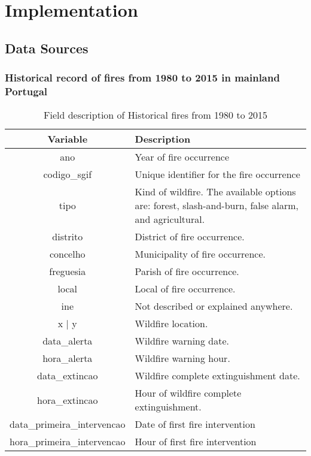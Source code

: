 \chapter{Implementation}
\label{sec:implementation}

\section{Data Sources}

\subsection{Historical record of fires from 1980 to 2015 in mainland Portugal \cite{centraldedados_incendios_website}\cite{centraldedados_incendios} \cite{icnf2024}}

\begin{table}[h!]
\caption{Field description of Historical fires from 1980 to 2015}
\label{forest_inventory}
\centering
\small
\begin{tabular}{|c|p{7.5cm}|} %
\hline
\textbf{Variable} & \textbf{Description}\\
\hline
ano  & Year of fire occurrence \\
\hline
codigo\_sgif & Unique identifier for the fire occurrence \\
\hline
tipo  & Kind of wildfire. The available options are: forest, slash-and-burn, false alarm, and agricultural.\\
\hline
distrito  & District of fire occurrence. \\
\hline
concelho  & Municipality of fire occurrence. \\
\hline
freguesia  & Parish of fire occurrence.\\
\hline
local  & Local of fire occurrence. \\
\hline
ine  & Not described or explained anywhere. \\
\hline
x | y  & Wildfire location. \\
\hline
data\_alerta  & Wildfire warning date. \\
\hline
hora\_alerta  & Wildfire warning hour. \\
\hline
data\_extincao & Wildfire complete extinguishment date. \\
\hline
hora\_extincao & Hour of wildfire complete extinguishment. \\
\hline
data\_primeira\_intervencao & Date of first fire intervention \\
\hline
hora\_primeira\_intervencao & Hour of first fire intervention \\

\end{tabular}
\end{table}
